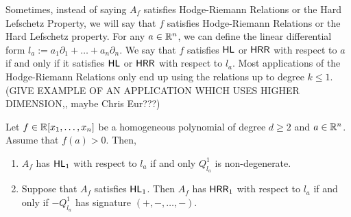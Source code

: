 \documentclass{puthesis-UG}
\begin{document}
Sometimes, instead of saying $A_f$ satisfies Hodge-Riemann Relations or the Hard Lefschetz Property, we will say that $f$ satisfies Hodge-Riemann Relations or the Hard Lefschetz property. For any $a \in \mathbb{R}^n$, we can define the linear differential form $l_a := a_1 \partial_1 + \ldots + a_n \partial_n$. We say that $f$ satisfies $\mathsf{HL}$ or $\mathsf{HRR}$ with respect to $a$ if and only if it satisfies $\mathsf{HL}$ or $\mathsf{HRR}$ with respect to $l_a$. Most applications of the Hodge-Riemann Relations only end up using the relations up to degree $k \leq 1$. (GIVE EXAMPLE OF AN APPLICATION WHICH USES HIGHER DIMENSION,, maybe Chris Eur???) 

\begin{prop}  \label{conditions-for-HL-HRR}
	Let $f \in \mathbb{R}[x_1, \ldots, x_n]$ be a homogeneous polynomial of degree $d \geq 2$ and $a \in \mathbb{R}^n$. Assume that $f(a) > 0$. Then, 
	\begin{enumerate}[label = (\alph*)]
		\item $A_f$ has $\mathsf{HL}_1$ with respect to $l_a$ if and only $Q_{l_a}^1$ is non-degenerate. 

		\item Suppose that $A_f$ satisfies $\mathsf{HL}_1$. Then $A_f$ has $\mathsf{HRR}_1$ with respect to $l_a$ if and only if $-Q_{l_a}^1$ has signature $(+, -, \ldots, -)$. 
	\end{enumerate}
\end{prop}
\end{document}
